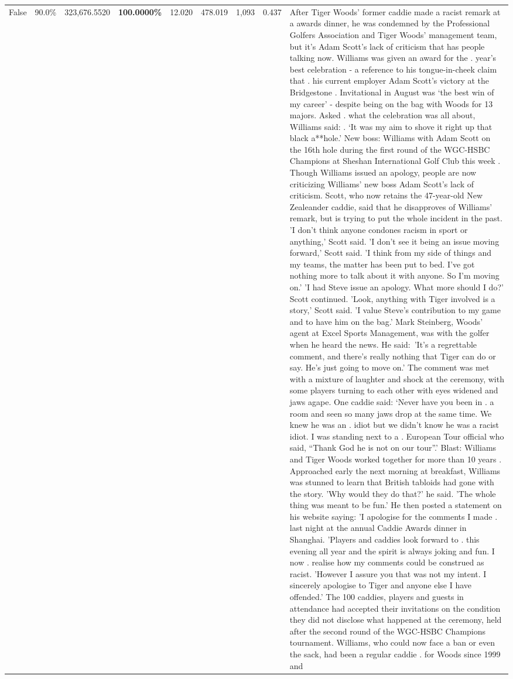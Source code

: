 \begin{table}[H]
\begin{tabular}{lllrlllll}
False & 90.0\% & 323,676.5520 & \bfseries \color{red} 100.0000\% & 12.020 & 478.019 & 1,093 & 0.437 & After Tiger Woods' former caddie made a racist remark at a awards dinner, he was condemned by the Professional Golfers Association and Tiger Woods' management team, but it's Adam Scott's lack of criticism that has people talking now. Williams was given an award for the . year’s best celebration - a reference to his tongue-in-cheek claim that . his current employer Adam Scott’s victory at the Bridgestone . Invitational in August was ‘the best win of my career’ - despite being on the bag with Woods for 13 majors. Asked . what the celebration was all about, Williams said: . ‘It was my aim to shove it right up that black a**hole.’ New boss: Williams with Adam Scott  on the 16th hole during the first round of the WGC-HSBC Champions at Sheshan International Golf Club this week . Though Williams issued an apology, people are now criticizing Williams' new boss Adam Scott's lack of criticism. Scott, who now retains the 47-year-old New Zealeander caddie, said that he disapproves of Williams' remark, but is trying to put the whole incident in the past. 'I don't think anyone condones racism in sport or anything,' Scott said. 'I don't see it being an issue moving forward,' Scott said. 'I think from my side of things and my teams, the matter has been put to bed. I've got nothing more to talk about it with anyone. So I'm moving on.' 'I had Steve issue an apology. What more should I do?' Scott continued. 'Look, anything with Tiger involved is a story,' Scott said. 'I value Steve's contribution to my game and to have him on the bag.' Mark Steinberg, Woods' agent at Excel Sports Management, was with the golfer when he heard the news. He said: 'It's a regrettable comment, and there's really nothing that Tiger can do or say. He's just going to move on.' The comment was met with a mixture of laughter and shock at the ceremony, with some players turning to each other with eyes widened and jaws agape. One caddie said: ‘Never have you been in . a room and seen so many jaws drop at the same time. We knew he was an . idiot but we didn’t know he was a racist idiot. I was standing next to a . European Tour official who said, “Thank God he is not on our tour”.’ Blast: Williams and Tiger Woods worked together for more than 10 years . Approached early the next morning at breakfast, Williams was stunned to learn that British tabloids had gone with the story. 'Why would they do that?' he said. 'The whole thing was meant to be fun.' He then posted a statement on his website saying: 'I apologise for the comments I made . last night at the annual Caddie Awards dinner in Shanghai. 'Players and caddies look forward to . this evening all year and the spirit is always joking and fun. I now . realise how my comments could be construed as racist. 'However I assure you that was not my intent. I sincerely apologise to Tiger and anyone else I have offended.' The 100 caddies, players and guests in attendance had accepted their invitations on the condition they did not disclose what happened at the ceremony, held after the second round of the WGC-HSBC Champions tournament. Williams, who could now face a ban or even the sack, had been a regular caddie . for Woods since 1999 and 
\end{tabular}
\end{table}

